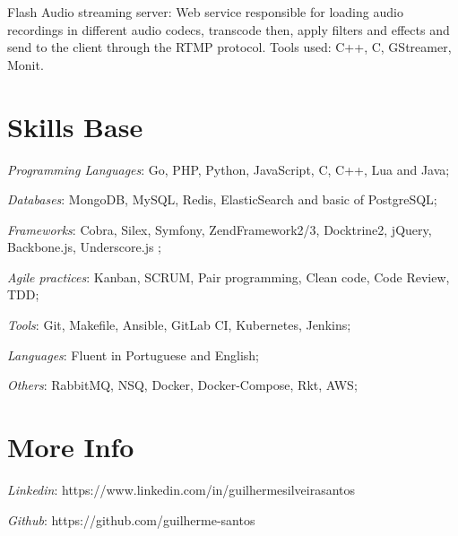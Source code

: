 \documentclass[margin]{res}
\begin{document}
\begin{resume}
Flash Audio streaming server: Web service responsible for loading audio recordings in different audio codecs, transcode then, apply filters and effects and send to the client through the RTMP protocol. Tools used: C++, C, GStreamer, Monit.

\section{Skills Base} \textit{Programming Languages}: Go, PHP, Python, JavaScript, C, C++, Lua and Java;

	\textit{Databases}: MongoDB, MySQL, Redis, ElasticSearch and basic of PostgreSQL;

	\textit{Frameworks}: Cobra, Silex, Symfony, ZendFramework2/3, Docktrine2, jQuery, Backbone.js, Underscore.js ;

	\textit{Agile practices}: Kanban, SCRUM, Pair programming, Clean code, Code Review, TDD;

	\textit{Tools}: Git, Makefile, Ansible, GitLab CI, Kubernetes, Jenkins;

	\textit{Languages}: Fluent in Portuguese and English;

	\textit{Others}: RabbitMQ, NSQ, Docker, Docker-Compose, Rkt, AWS;

\section{More Info} \textit{Linkedin}: https://www.linkedin.com/in/guilhermesilveirasantos

    \textit{Github}: https://github.com/guilherme-santos

\end{resume}
\end{document}
